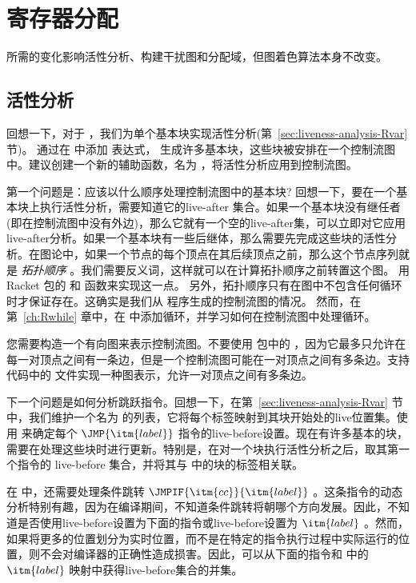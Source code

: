 \documentclass[11pt]{book}
\begin{document}
\section{寄存器分配}
\label{sec:register-allocation-Rif}

 \LangIf{} 所需的变化影响活性分析、构建干扰图和分配域，但图着色算法本身不改变。

\subsection{活性分析}
\label{sec:liveness-analysis-Rif}

回想一下，对于 \LangVar{} ，我们为单个基本块实现活性分析(第~\ref{sec:liveness-analysis-Rvar} 节)。 通过在 \LangIf{} 中添加  表达式， 
生成许多基本块，这些块被安排在一个控制流图中。建议创建一个新的辅助函数，名为
 ，将活性分析应用到控制流图。

第一个问题是：应该以什么顺序处理控制流图中的基本块? 回想一下，要在一个基本块上执行活性分析，需要知道它的live-after 集合。如果一个基本块没有继任者(即在控制流图中没有外边)，那么它就有一个空的live-after集，可以立即对它应用live-after分析。如果一个基本块有一些后继体，那么需要先完成这些块的活性分析。在图论中，如果一个节点的每个顶点在其后续顶点之前，那么这个节点序列就是 \emph{拓扑顺序} 。我们需要反义词，这样就可以在计算拓扑顺序之前转置这个图。
%
用 Racket  包的  和  函数来实现这一点。
%
另外，拓扑顺序只有在图中不包含任何循环时才保证存在。这确实是我们从 \LangIf{} 程序生成的控制流图的情况。
然而，在第~\ref{ch:Rwhile} 章中，在 \LangLoop{} 中添加循环，并学习如何在控制流图中处理循环。

您需要构造一个有向图来表示控制流图。不要使用  包中的  ，因为它最多只允许在每一对顶点之间有一条边，但是一个控制流图可能在一对顶点之间有多条边。支持代码中的  文件实现一种图表示，允许一对顶点之间有多条边。

下一个问题是如何分析跳跃指令。回想一下，在第~\ref{sec:liveness-analysis-Rvar} 节中，我们维护一个名为
 的列表，它将每个标签映射到其块开始处的live位置集。使用  来确定每个 $\JMP{\itm{label}}$ 指令的live-before设置。现在有许多基本的块，  需要在处理这些块时进行更新。特别是，在对一个块执行活性分析之后，取其第一个指令的 live-before 集合，并将其与 中的块的标签相关联。

在 \LangXIfVar{} 中，还需要处理条件跳转
$\JMPIF{\itm{cc}}{\itm{label}}$ 。这条指令的动态分析特别有趣，因为在编译期间，不知道条件跳转将朝哪个方向发展。因此，不知道是否使用live-before设置为下面的指令或live-before设置为 $\itm{label}$ 。然而，如果将更多的位置划分为实时位置，而不是在特定的指令执行过程中实际运行的位置，则不会对编译器的正确性造成损害。因此，可以从下面的指令和
  中的 $\itm{label}$ 映射中获得live-before集合的并集。
\end{document}
